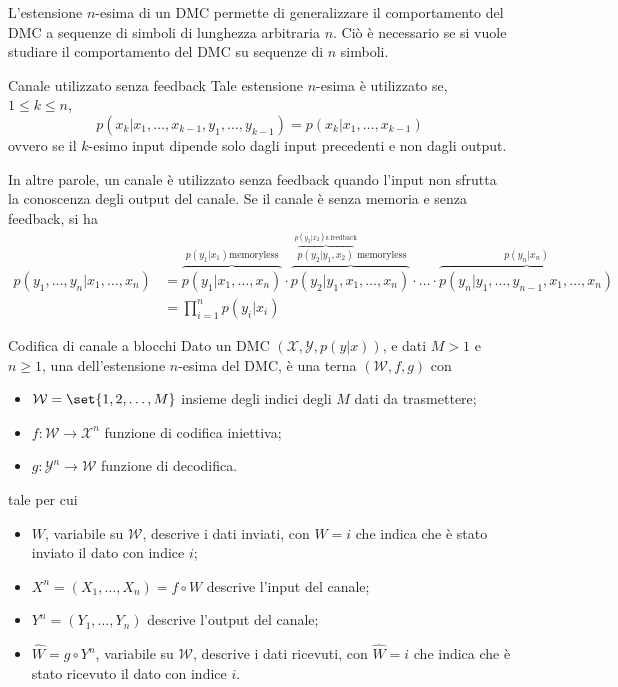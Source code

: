 L'estensione $n$-esima di un DMC permette di generalizzare il comportamento del DMC a sequenze di simboli di lunghezza arbitraria $n$. 
Ciò è necessario se si vuole studiare il comportamento del DMC su sequenze di $n$ simboli.

\begin{definition}{Canale utilizzato senza feedback}
  Tale estensione \(n\)-esima è utilizzato  se, \(1\leq k \leq n\), 
  \[p(x_k|x_1,\ldots,x_{k-1},y_1,\ldots,y_{k-1}) = p(x_k|x_1,\ldots,x_{k-1})\] 
  ovvero se il \(k\)-esimo input dipende solo dagli input precedenti e non dagli output.
\end{definition}

In altre parole, un canale è utilizzato senza feedback quando l'input non sfrutta la conoscenza degli output del canale.
Se il canale è senza memoria e senza feedback, si ha
\begin{equation*}
  \begin{aligned}
    p(y_1,\ldots,y_n|x_1,\ldots,x_n)&=\overbrace{p(y_1|x_1,\dots,x_n)}^{p(y_1|x_1) \text{memoryless}}\cdot \overbrace{p(y_2|y_1,x_1,\dots,x_n)}^{\overbrace{p(y_2|y_1,x_2)}^{p(y_2|x_2) \text{s.feedback}} \text{memoryless}}\cdot \ldots \cdot \overbrace{p(y_n|y_1,\ldots,y_{n-1},x_1,\ldots,x_n)}^{p(y_n|x_n)} \\
    &=\prod_{i=1}^{n}p(y_i|x_i)
  \end{aligned}
\end{equation*}

\begin{definition}{Codifica di canale a blocchi}
  Dato un DMC \((\mathcal{X}, \mathcal{Y}, p(y|x))\), e dati \(M>1\) e \(n\geq 1\), una  dell'estensione \(n\)-esima del DMC, è una terna \((\mathcal{W},f,g)\) con
  \begin{itemize}
    \item \(\mathcal{W} = \set{1,2,\ldots,M}\) insieme degli indici degli $M$ dati da trasmettere;
    \item \(f: \mathcal{W} \to \mathcal{X}^n\) funzione di codifica iniettiva;
    \item \(g: \mathcal{Y}^n \to \mathcal{W}\) funzione di decodifica.
  \end{itemize}
  tale per cui
  \begin{itemize}
    \item \(W\), variabile su \(\mathcal{W}\), descrive i dati inviati, con $W=i$ che indica che è stato inviato il dato con indice $i$;
    \item \(X^n = (X_1, \ldots, X_n) = f\circ W\) descrive l'input del canale;
    \item \(Y^n = (Y_1, \ldots, Y_n)\) descrive l'output del canale;
    \item \(\hat{W} = g \circ Y^n\), variabile su \(\mathcal{W}\), descrive i dati ricevuti, con $\hat{W}=i$ che indica che è stato ricevuto il dato con indice $i$.
  \end{itemize}
\end{definition}


